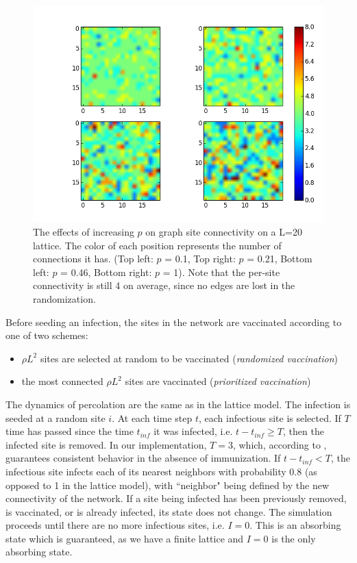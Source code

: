 \documentclass{article}
\begin{document}
\begin{figure}[h!]
\centering
\includegraphics[scale=0.5]{figs/increasing_p.png}
\caption{The effects of increasing $p$ on graph site connectivity on a L=20 lattice. The color of each position represents the number of connections it has. (Top left: $p$ = 0.1, Top right: $p$ = 0.21, Bottom left: $p$ = 0.46, Bottom right: $p$ = 1). Note that the per-site connectivity is still 4 on average, since no edges are lost in the randomization.}
\label{fig:p_connect}
\end{figure}

Before seeding an infection, the sites in the network are vaccinated according to one of two schemes:
\begin{itemize}
\item $\rho L^2$ sites are selected at random to be vaccinated (\textit{randomized vaccination})
\item the most connected $\rho L^2$ sites are vaccinated (\textit{prioritized vaccination})
\end{itemize}
The dynamics of percolation are the same as in the lattice model. The infection is seeded at a random site $i$. At each time step $t$, each infectious site is selected. If $T$ time has passed since the time $t_{inf}$ it was infected, i.e. $t - t_{inf} \geq T$, then the infected site is removed. In our implementation, $T = 3$, which, according to \cite{Zanette}, guarantees consistent behavior in the absence of immunization. If $t - t_{inf} < T$, the infectious site infects each of its nearest neighbors with probability $0.8$ (as opposed to 1 in the lattice model), with ``neighbor" being defined by the new connectivity of the network. If a site being infected has been previously removed, is vaccinated, or is already infected, its state does not change. The simulation proceeds until there are no more infectious sites, i.e. $I=0$. This is an absorbing state which is guaranteed, as we have a finite lattice and $I = 0$ is the only absorbing state.
\end{document}
